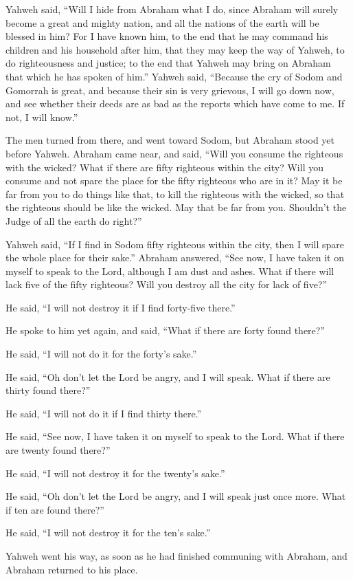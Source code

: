{Yahweh said, “Will I hide from Abraham what I do,
since Abraham will surely become a great and mighty nation, and all the nations of the earth will be blessed in him?
For I have known him, to the end that he may command his children and his household after him, that they may keep the way of Yahweh, to do righteousness and justice; to the end that Yahweh may bring on Abraham that which he has spoken of him.”
Yahweh said, “Because the cry of Sodom and Gomorrah is great, and because their sin is very grievous,
I will go down now, and see whether their deeds are as bad as the reports which have come to me. If not, I will know.”
\par }{\PP {}The men turned from there, and went toward Sodom, but Abraham stood yet before Yahweh.
Abraham came near, and said, “Will you consume the righteous with the wicked?
What if there are fifty righteous within the city? Will you consume and not spare the place for the fifty righteous who are in it?
May it be far from you to do things like that, to kill the righteous with the wicked, so that the righteous should be like the wicked. May that be far from you. Shouldn’t the Judge of all the earth do right?”
\par }{\PP {}Yahweh said, “If I find in Sodom fifty righteous within the city, then I will spare the whole place for their sake.”
Abraham answered, “See now, I have taken it on myself to speak to the Lord, although I am dust and ashes.
What if there will lack five of the fifty righteous? Will you destroy all the city for lack of five?”
\par }{\PP He said, “I will not destroy it if I find forty-five there.”
\par }{\PP {}He spoke to him yet again, and said, “What if there are forty found there?”
\par }{\PP He said, “I will not do it for the forty’s sake.”
\par }{\PP {}He said, “Oh don’t let the Lord be angry, and I will speak. What if there are thirty found there?”
\par }{\PP He said, “I will not do it if I find thirty there.”
\par }{\PP {}He said, “See now, I have taken it on myself to speak to the Lord. What if there are twenty found there?”
\par }{\PP He said, “I will not destroy it for the twenty’s sake.”
\par }{\PP {}He said, “Oh don’t let the Lord be angry, and I will speak just once more. What if ten are found there?”
\par }{\PP He said, “I will not destroy it for the ten’s sake.”
\par }{\PP {}Yahweh went his way, as soon as he had finished communing with Abraham, and Abraham returned to his place.

}
